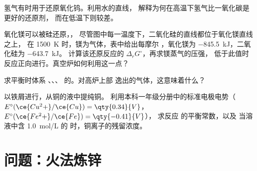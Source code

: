 \begin{exercise}[$\star\star$]\label{exo:b2:ellingham:9}
氢气有时用于还原氧化钨。利用水的直线，
解释为何在高温下氢气比一氧化碳是更好的还原剂，
而在低温下则较差。
\end{exercise}

\begin{exercise}[$\star\star\star$]\label{exo:b2:ellingham:10}
氧化镁可以被硅还原，，
尽管图中每一温度下，二氧化硅的直线都位于氧化镁直线之上，
在 \qty{1500}{K} 时，镁为气体，表中给出每摩尔
，氧化镁为 \qty{-845.5}{kJ}，二氧化硅为 \qty{-643.7}{kJ}。
计算该还原反应的 $\Delta_r G^\circ$，再求镁蒸气的压强，
低于此值时反应正向进行。真空炉如何利用这一点？
\end{exercise}

\begin{exercise}[$\star\star\star$]\label{exo:b2:ellingham:11}
求平衡时体系 、、、
 的。对高炉上部
逸出的气体，这意味着什么？
\end{exercise}

\begin{exercise}[$\star\star\star$]\label{exo:b2:ellingham:12}
以铁屑进行，从铜的液中提纯铜。
利用本科一年级分册中的标准电极电势（$E^\circ(\ce{Cu^2+}/\ce{Cu})
= \qty{0.34}{V}$，$E^\circ(\ce{Fe^2+}/\ce{Fe}) = \qty{-0.41}{V}$），
求反应  的平衡常数，以及
当溶液中含 \qty{1.0}{mol/L} 的
 时，铜离子的残留浓度。
\end{exercise}

\section{问题：火法炼锌}

